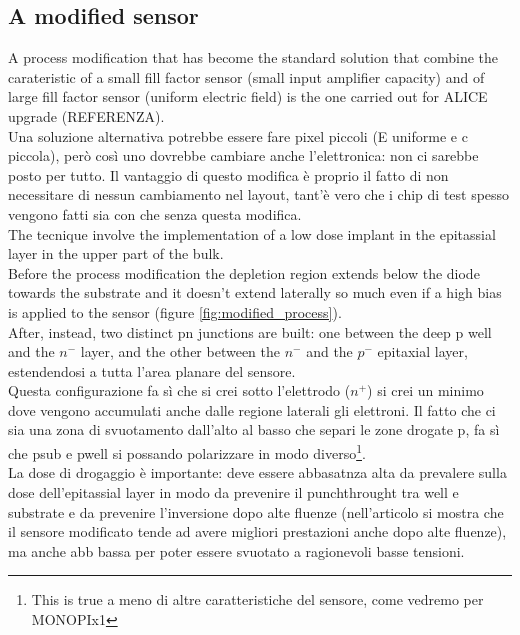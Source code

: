 \subsection{A modified sensor}
A process modification that has become the standard solution that combine the carateristic
of a small fill factor sensor (small input amplifier capacity) and of large fill factor sensor
(uniform electric field) is the one carried out for ALICE upgrade (REFERENZA).\\
Una soluzione alternativa potrebbe essere fare pixel piccoli (E uniforme e c piccola), però 
così uno dovrebbe cambiare anche l'elettronica: non ci sarebbe posto per tutto. Il vantaggio
di questo modifica è proprio il fatto di non necessitare di nessun cambiamento nel layout,
tant'è vero che i chip di test spesso vengono fatti sia con che senza questa modifica.\\
The tecnique involve the implementation of a low dose implant in the epitassial layer in the 
upper part of the bulk.\\
Before the process modification the depletion region extends below the diode towards the 
substrate and it doesn't extend laterally so much even if a high bias is applied to 
the sensor (figure \ref{fig:modified_process}). \\
After, instead, two distinct pn junctions are built: one between the deep p well and the 
$n^-$ layer, and the other between the $n^-$ and the $p^-$ epitaxial layer, estendendosi a tutta l'area
planare del sensore.\\
Questa configurazione fa sì che si crei sotto l'elettrodo ($n^+$) si crei un minimo dove vengono 
accumulati anche dalle regione laterali gli elettroni. 
Il fatto che ci sia una zona di svuotamento dall'alto al basso che separi le zone drogate p, fa sì
che psub e pwell si possando polarizzare in modo diverso\footnote{This is true a meno di altre 
caratteristiche del sensore, come vedremo per MONOPIx1}.\\
La dose di drogaggio è importante: deve essere abbasatnza alta da prevalere sulla dose
dell'epitassial layer in modo da prevenire il punchthrought tra well e substrate e da 
prevenire l'inversione dopo alte fluenze (nell'articolo si mostra che il sensore modificato
tende ad avere migliori prestazioni anche dopo alte fluenze), ma anche abb bassa per poter essere svuotato 
a ragionevoli basse tensioni.\\
